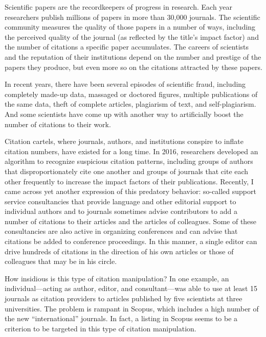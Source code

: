 Scientific papers are the recordkeepers of progress in research. Each year researchers publish millions of papers in more than 30,000 journals. The scientific community measures the quality of those papers in a number of ways, including the perceived quality of the journal (as reflected by the title's impact factor) and the number of citations a specific paper accumulates. The careers of scientists and the reputation of their institutions depend on the number and prestige of the papers they produce, but even more so on the citations attracted by these papers.


In recent years, there have been several episodes of scientific fraud, including completely made-up data, massaged or doctored figures, multiple publications of the same data, theft of complete articles, plagiarism of text, and self-plagiarism. And some scientists have come up with another way to artificially boost the number of citations to their work.


Citation cartels, where journals, authors, and institutions conspire to inflate citation numbers, have existed for a long time. In 2016, researchers developed an algorithm to recognize suspicious citation patterns, including groups of authors that disproportionately cite one another and groups of journals that cite each other frequently to increase the impact factors of their publications. Recently, I came across yet another expression of this predatory behavior: so-called support service consultancies that provide language and other editorial support to individual authors and to journals sometimes advise contributors to add a number of citations to their articles and the articles of colleagues. Some of these consultancies are also active in organizing conferences and can advise that citations be added to conference proceedings. In this manner, a single editor can drive hundreds of citations in the direction of his own articles or those of colleagues that may be in his circle.


How insidious is this type of citation manipulation? In one example, an individual—acting as author, editor, and consultant—was able to use at least 15 journals as citation providers to articles published by five scientists at three universities. The problem is rampant in Scopus, which includes a high number of the new ``international'' journals. In fact, a listing in Scopus seems to be a criterion to be targeted in this type of citation manipulation.